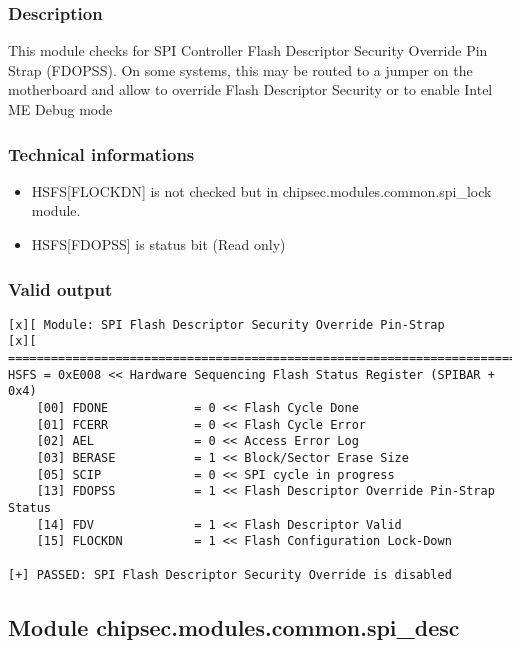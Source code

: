 \hypertarget{description}{%
\subsubsection{Description}\label{description}}

This module checks for SPI Controller Flash Descriptor Security Override
Pin Strap (FDOPSS). On some systems, this may be routed to a jumper on
the motherboard and allow to override Flash Descriptor Security or to
enable Intel ME Debug mode

\hypertarget{technical-informations}{%
\subsubsection{Technical informations}\label{technical-informations}}

\begin{itemize}
\tightlist
\item
  HSFS{[}FLOCKDN{]} is not checked but in
  chipsec.modules.common.spi\_lock module.
\item
  HSFS{[}FDOPSS{]} is status bit (Read only)
\end{itemize}

\hypertarget{valid-output}{%
\subsubsection{Valid output}\label{valid-output}}

\begin{verbatim}
[x][ Module: SPI Flash Descriptor Security Override Pin-Strap
[x][ =======================================================================
HSFS = 0xE008 << Hardware Sequencing Flash Status Register (SPIBAR + 0x4)
    [00] FDONE            = 0 << Flash Cycle Done 
    [01] FCERR            = 0 << Flash Cycle Error 
    [02] AEL              = 0 << Access Error Log 
    [03] BERASE           = 1 << Block/Sector Erase Size 
    [05] SCIP             = 0 << SPI cycle in progress 
    [13] FDOPSS           = 1 << Flash Descriptor Override Pin-Strap Status 
    [14] FDV              = 1 << Flash Descriptor Valid 
    [15] FLOCKDN          = 1 << Flash Configuration Lock-Down
  
[+] PASSED: SPI Flash Descriptor Security Override is disabled
\end{verbatim}

\hypertarget{module-chipsec.modules.common.spi_desc}{%
\subsection{Module
chipsec.modules.common.spi\_desc}\label{module-chipsec.modules.common.spi_desc}}

